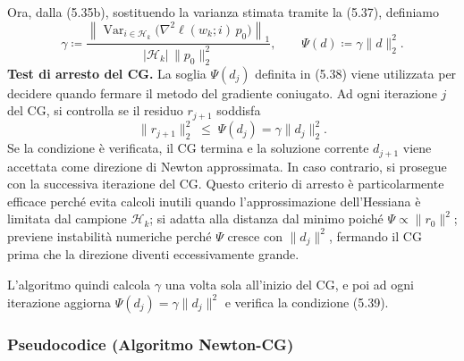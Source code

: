 \documentclass[a4paper,12pt]{article}
\numberwithin{equation}{section}
\numberwithin{figure}{section}
\numberwithin{table}{section}
\begin{document}
Ora, dalla (5.35b), sostituendo la varianza stimata tramite la (5.37), definiamo
\[
\gamma \coloneqq
\frac{\left\| \operatorname{Var}_{i\in\mathcal{H}_k}\bigl(\nabla^2\ell(w_k;i)\,p_0\bigr) \right\|_1}{|\mathcal{H}_k| \, \|p_0\|_2^2},
\qquad
\Psi(d) \coloneqq \gamma \|d\|_2^2.
\tag{5.38}
\]
\medskip
\noindent
\textbf{Test di arresto del CG.}
La soglia $\Psi(d_j)$ definita in (5.38) viene utilizzata per decidere quando fermare il metodo del gradiente coniugato. Ad ogni iterazione $j$ del CG, si controlla se il residuo $r_{j+1}$ soddisfa
\[
\| r_{j+1} \|_2^2 \;\le\; \Psi(d_j) = \gamma \|d_j\|_2^2.
\tag{5.39}
\]
Se la condizione è verificata, il CG termina e la soluzione corrente $d_{j+1}$ viene accettata come direzione di Newton approssimata. In caso contrario, si prosegue con la successiva iterazione del CG.
Questo criterio di arresto è particolarmente efficace perché evita calcoli inutili quando l'approssimazione dell'Hessiana è limitata dal campione $\mathcal{H}_k$; si adatta alla distanza dal minimo poiché $\Psi \propto \|r_0\|^2$; previene instabilità numeriche perché $\Psi$ cresce con $\|d_j\|^2$, fermando il CG prima che la direzione diventi eccessivamente grande.

L'algoritmo quindi calcola $\gamma$ una volta sola all'inizio del CG, e poi ad ogni iterazione aggiorna $\Psi(d_j) = \gamma \|d_j\|^2$ e verifica la condizione (5.39).
\medskip
\noindent
\newpage
\subsubsection{Pseudocodice (Algoritmo Newton-CG)}
\end{document}
